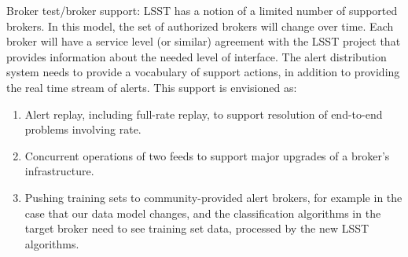 Broker test/broker support: LSST has a notion of a limited number of supported brokers. In this model, the set of authorized brokers will change over time. Each broker will have a service level (or similar) agreement with the LSST project that provides information about the needed level of interface. The alert distribution system needs to provide a vocabulary of support actions, in addition to providing the real time stream of alerts. This support is envisioned as:

\begin{enumerate}

\item Alert replay, including full-rate replay, to support resolution of end-to-end problems involving rate.

\item Concurrent operations of two feeds to support major upgrades of a broker’s infrastructure.

\item Pushing training sets to community-provided alert brokers, for example in the case that our data model changes, and the classification algorithms in the target broker need to see training set data, processed by the new LSST algorithms.

\end{enumerate}
